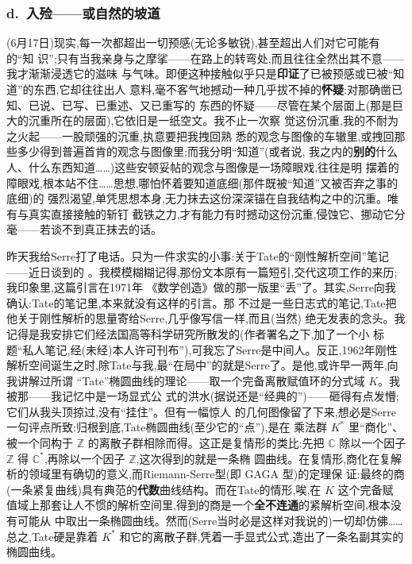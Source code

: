 \subsubsection*{d.\ 入殓——或自然的坡道}

\pmark{}(6月17日)现实,每一次都超出一切预感(无论多敏锐),甚至超出人们对它可能有的“知
识”;只有当我亲身与之摩挲——在路上的转弯处,而且往往全然出其不意——我才渐渐浸透它的滋味
与气味。即便这种接触似乎只是\textbf{印证}了已被预感或已被“知道”的东西,它却往往出人
意料,毫不客气地撼动一种几乎拔不掉的\textbf{怀疑}:对那确凿已知、已说、已写、已重述、又已重写的
东西的怀疑——尽管在某个层面上(那是巨大的沉重所在的层面),它依旧是一纸空文。我不止一次察
觉这份沉重,我的不耐为之火起——一股顽强的沉重,执意要把我拽回熟
悉的观念与图像的车辙里,或拽回那些多少得到普遍首肯的观念与图像里;而我分明“知道”(或者说,
我之内的\textbf{别的}什么人、什么东西知道……)这些安顿妥帖的观念与图像是一场障眼戏,往往是明
摆着的障眼戏,根本站不住……思想,哪怕怀着要知道底细(那件既被“知道”又被否弃之事的底细)的
强烈渴望,单凭思想本身,无力抹去这份深深锚在自我结构之中的沉重。唯有与真实直接接触的斩钉
截铁之力,才有能力有时撼动这份沉重,侵蚀它、挪动它分毫——若谈不到真正抹去的话。

昨天我给Serre打了电话。只为一件求实的小事:关于Tate的“刚性解析空间”笔记——近日谈到的
。我模模糊糊记得,那份文本原有一篇短引,交代这项工作的来历;我印象里,这篇引言在1971年
《数学创造》做的那一版里“丢”了。其实,Serre向我确认:Tate的笔记里,本来就没有这样的引言。那
不过是一些日志式的笔记,Tate把他关于刚性解析的思量寄给Serre,几乎像写信一样,而且(当然)
绝无发表的念头。我记得是我安排它们经法国高等科学研究所散发的(作者署名之下,加了一个小
标题“私人笔记,经(未经)本人许可刊布”\dmark{}),可我忘了Serre是中间人。反正,1962年刚性
解析空间诞生之时,除Tate与我,最“在局中”的就是Serre了。是他,或许早一两年,向我讲解过所谓
“Tate”椭圆曲线的理论——取一个完备离散赋值环的分式域 $K$。我被那——我记忆中是一场显式公
式的洪水(据说还是“经典的”)——砸得有点发懵;它们从我头顶掠过,没有“挂住”。但有一幅惊人
的几何图像留了下来,想必是Serre一句评点所致:归根到底,Tate椭圆曲线(至少它的“点”),是在
乘法群 $K^*$ 里“商化”、被一个同构于 $\mathbb{Z}$ 的离散子群相除而得。这正是复情形的类比:先把
$\mathbb{C}$ 除以一个因子 $\mathbb{Z}$ 得 $\mathbb{C}^*$,再除以一个因子 $\mathbb{Z}$,这次得到的就是一条椭
圆曲线。在复情形,商化在复解析的领域里有确切的意义,而Riemann-Serre型(即 GAGA 型)的定理保
证:最终的商(一条紧复曲线)具有典范的\textbf{代数}曲线结构。而在Tate的情形,唉,在 $K$ 这个完备赋
值域上那套让人不惯的解析空间里,得到的商是一个\textbf{全不连通}的紧解析空间,根本没有可能从
中取出一条椭圆曲线。然而(Serre当时必是这样对我说的)一切却仿佛……总之,Tate硬是靠着 $K^*$
和它的离散子群,凭着一手显式公式,造出了一条名副其实的椭圆曲线。

